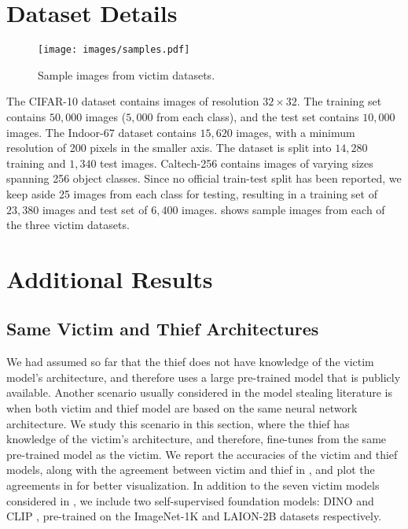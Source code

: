 
\appendix

\section{Dataset Details}

\begin{wrapfigure}{R}{0.55\textwidth}
	\centering
	\texttt{[image: images/samples.pdf]}
	\caption{Sample images from victim datasets.}
	\label{fig:sample_images}
\end{wrapfigure}

The CIFAR-10 dataset contains images of resolution $32\times32$. The training set contains $50,000$ images ($5,000$ from each class), and the test set contains $10,000$ images.
%
The Indoor-67 dataset contains $15,620$ images, with a minimum resolution of 200 pixels in the smaller axis. The dataset is split into $14,280$ training and $1,340$ test images.
%
Caltech-256 contains images of varying sizes spanning 256 object classes. Since no official train-test split has been reported, we keep aside 25 images from each class for testing, resulting in a training set of $23,380$ images and test set of $6,400$ images.
%
 shows sample images from each of the three victim datasets. 

%
%
%
\section{Additional Results}

\subsection{Same Victim and Thief Architectures} \label{sec:same_victim_thief}
We had assumed so far that the thief does not have knowledge of the victim model's architecture, and therefore uses a large pre-trained model that is publicly available. Another scenario usually considered in the  model stealing literature \cite{orekondy2019knockoff,pal2020activethief} is when both victim and thief model are based on the same neural network architecture. We study this scenario in this section, where the thief has knowledge of the victim's architecture, and therefore, fine-tunes from the same pre-trained model as the victim. We report the accuracies of the victim and thief models, along with the agreement between victim and thief in , and plot the agreements in  for better visualization. In addition to the seven victim models considered in , we include two self-supervised foundation models: DINO \cite{caron2021emerging} and CLIP \cite{radford2021learning}, pre-trained on the ImageNet-1K and LAION-2B datasets respectively. 

